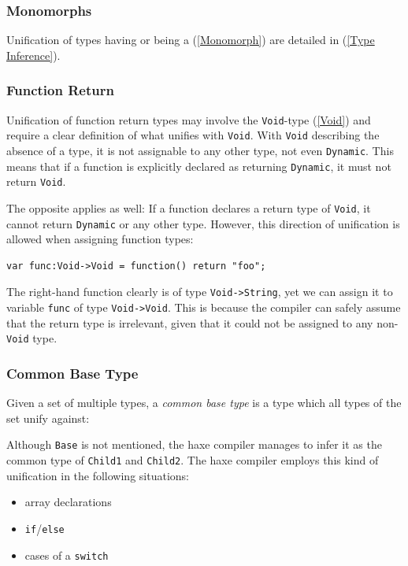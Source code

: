 \documentclass{article}
\newcommand{\type}[1]{\texttt{#1}}
\newcommand{\expr}[1]{\texttt{#1}}
\newcommand{\fullref}[1]{\nameref{#1} (\cref{#1})}
\begin{document}
\subsubsection{Monomorphs}
\label{Monomorphs}

Unification of types having or being a \fullref{Monomorph} are detailed in \fullref{Type Inference}.


\subsubsection{Function Return}

Unification of function return types may involve the \type{Void}-type (\cref{Void}) and require a clear definition of what unifies with \type{Void}. With \type{Void} describing the absence of a type, it is not assignable to any other type, not even \type{Dynamic}. This means that if a function is explicitly declared as returning \type{Dynamic}, it must not return \type{Void}.

The opposite applies as well: If a function declares a return type of \type{Void}, it cannot return \type{Dynamic} or any other type. However, this direction of unification is allowed when assigning function types:

\begin{lstlisting}
var func:Void->Void = function() return "foo";
\end{lstlisting}
The right-hand function clearly is of type \type{Void->String}, yet we can assign it to variable \expr{func} of type \type{Void->Void}. This is because the compiler can safely assume that the return type is irrelevant, given that it could not be assigned to any non-\type{Void} type.


\subsubsection{Common Base Type}
\label{Common Base Type}

Given a set of multiple types, a \emph{common base type} is a type which all types of the set unify against:


Although \type{Base} is not mentioned, the haxe compiler manages to infer it as the common type of \type{Child1} and \type{Child2}. The haxe compiler employs this kind of unification in the following situations:

\begin{itemize}
	\item array declarations
	\item \expr{if}/\expr{else}
	\item cases of a \expr{switch}
\end{itemize}
\end{document}
